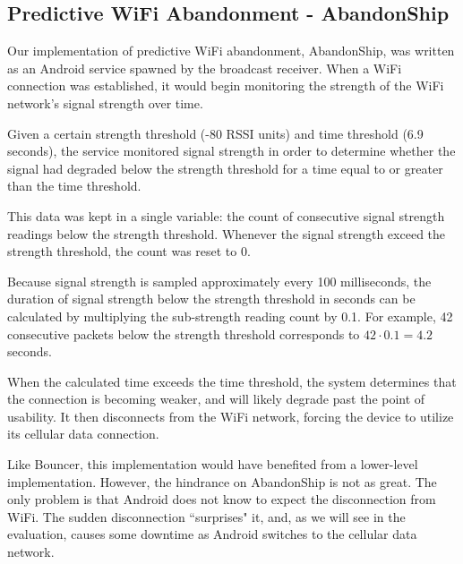 \subsection{Predictive WiFi Abandonment - AbandonShip}
Our implementation of predictive WiFi abandonment, AbandonShip, was written as an Android service spawned by the broadcast receiver. When a WiFi connection was established, it would begin monitoring the strength of the WiFi network's signal strength over time.

Given a certain strength threshold (-80 RSSI units) and time threshold (6.9 seconds), the service monitored signal strength in order to determine whether the signal had degraded below the strength threshold for a time equal to or greater than the time threshold.

This data was kept in a single variable: the count of consecutive signal strength readings below the strength threshold. Whenever the signal strength exceed the strength threshold, the count was reset to 0.

Because signal strength is sampled approximately every 100 milliseconds, the duration of signal strength below the strength threshold in seconds can be calculated by multiplying the sub-strength reading count by 0.1. For example, 42 consecutive packets below the strength threshold corresponds to $ 42 \cdot 0.1 = 4.2 $ seconds.

When the calculated time exceeds the time threshold, the system determines that the connection is becoming weaker, and will likely degrade past the point of usability. It then disconnects from the WiFi network, forcing the device to utilize its cellular data connection.

Like Bouncer, this implementation would have benefited from a lower-level implementation. However, the hindrance on AbandonShip is not as great. The only problem is that Android does not know to expect the disconnection from WiFi. The sudden disconnection ``surprises" it, and, as we will see in the evaluation, causes some downtime as Android switches to the cellular data network.
